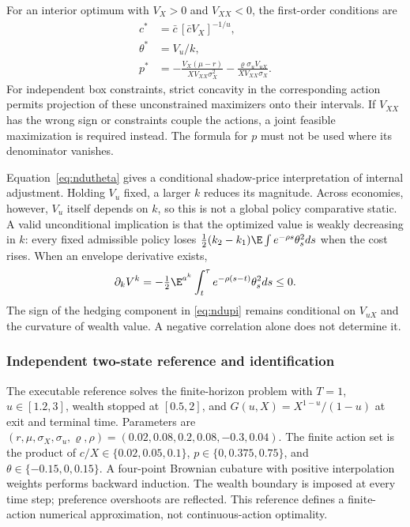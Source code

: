 For an interior optimum with $V_X>0$ and $V_{XX}<0$, the first-order conditions are
\begin{align}
 c^*&=\bar c\,[\bar c V_X]^{-1/u},\label{eq:nduc}\\
 \theta^*&=V_u/k,\label{eq:ndutheta}\\
 p^*&=-\frac{V_X(\mu-r)}{XV_{XX}\sigma_X^2}
       -\frac{\varrho\sigma_u V_{uX}}{XV_{XX}\sigma_X}.\label{eq:ndupi}
\end{align}
For independent box constraints, strict concavity in the corresponding action permits projection of these unconstrained maximizers onto their intervals. If $V_{XX}$ has the wrong sign or constraints couple the actions, a joint feasible maximization is required instead. The formula for $p$ must not be used where its denominator vanishes.

Equation~\eqref{eq:ndutheta} gives a conditional shadow-price interpretation of internal adjustment. Holding $V_u$ fixed, a larger $k$ reduces its magnitude. Across economies, however, $V_u$ itself depends on $k$, so this is not a global policy comparative static. A valid unconditional implication is that the optimized value is weakly decreasing in $k$: every fixed admissible policy loses $\tfrac12(k_2-k_1)\E\int e^{-\rho s}\theta_s^2ds$ when the cost rises. When an envelope derivative exists,
\begin{equation}\label{eq:envelope}
 \partial_k V^k=-\tfrac12\E^{a^k}\int_t^\tau e^{-\rho(s-t)}\theta_s^2ds\leq0.
\end{equation}
The sign of the hedging component in \eqref{eq:ndupi} remains conditional on $V_{uX}$ and the curvature of wealth value. A negative correlation alone does not determine it.

\subsubsection{Independent two-state reference and identification}
The executable reference solves the finite-horizon problem with $T=1$, $u\in[1.2,3]$, wealth stopped at $[0.5,2]$, and $G(u,X)=X^{1-u}/(1-u)$ at exit and terminal time. Parameters are $(r,\mu,\sigma_X,\sigma_u,\varrho,\rho)=(0.02,0.08,0.2,0.08,-0.3,0.04)$. The finite action set is the product of $c/X\in\{0.02,0.05,0.1\}$, $p\in\{0,0.375,0.75\}$, and $\theta\in\{-0.15,0,0.15\}$. A four-point Brownian cubature with positive interpolation weights performs backward induction. The wealth boundary is imposed at every time step; preference overshoots are reflected. This reference defines a finite-action numerical approximation, not continuous-action optimality.

